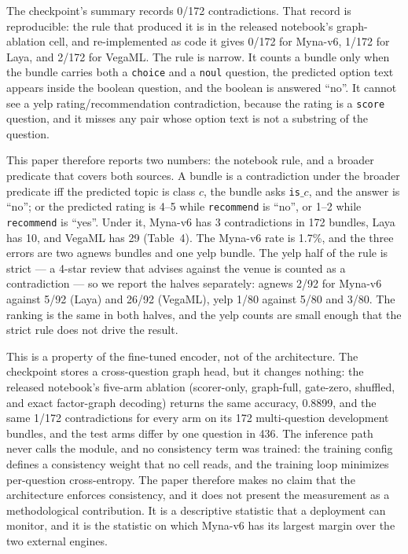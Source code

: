 \documentclass[11pt]{article}
\begin{document}
The checkpoint's summary records 0/172 contradictions. That record is reproducible: the rule that
produced it is in the released notebook's graph-ablation cell, and
re-implemented as code it gives 0/172 for Myna-v6{}, 1/172 for Laya, and 2/172 for VegaML. The rule
is narrow. It counts a bundle only when the bundle carries both a \texttt{choice} and a
\texttt{noul} question, the predicted option text appears inside the boolean question, and the
boolean is answered ``no''. It cannot see a yelp rating/recommendation contradiction, because the
rating is a \texttt{score} question, and it misses any pair whose option text is not a substring
of the question.

This paper therefore reports two numbers: the notebook rule, and a broader predicate that covers
both sources. A bundle is a contradiction under the broader predicate iff
the predicted topic is class $c$, the bundle asks \texttt{is}$\_c$, and the answer is ``no''; or
the predicted rating is 4--5 while \texttt{recommend} is ``no'', or 1--2 while \texttt{recommend}
is ``yes''. Under it, Myna-v6{} has 3 contradictions in 172 bundles, Laya has 10, and VegaML has 29
(Table~4). The Myna-v6{} rate is 1.7\%, and the three errors are two agnews
bundles and one yelp bundle. The yelp half of the rule is strict --- a 4-star review that advises
against the venue is counted as a contradiction --- so we report the halves separately: agnews
2/92 for Myna-v6{} against 5/92 (Laya) and 26/92 (VegaML), yelp 1/80 against 5/80 and 3/80. The
ranking is the same in both halves, and the yelp counts are small enough that the strict rule does
not drive the result.

This is a property of the fine-tuned encoder, not of the architecture. The checkpoint stores a
cross-question graph head, but it changes nothing: the released notebook's five-arm ablation
(scorer-only, graph-full, gate-zero, shuffled, and exact factor-graph decoding) returns the same
accuracy, 0.8899, and the same 1/172 contradictions for every arm on its 172 multi-question
development bundles, and the test arms differ by one question in 436. The inference path never calls the module, and no consistency term
was trained: the training config defines a consistency weight that no cell reads, and the training
loop minimizes per-question cross-entropy. The paper therefore makes
no claim that the architecture enforces consistency, and it does not present the measurement as a
methodological contribution. It is a descriptive statistic
that a deployment can monitor, and it is the statistic on which Myna-v6{} has its largest margin
over the two external engines.
\end{document}
